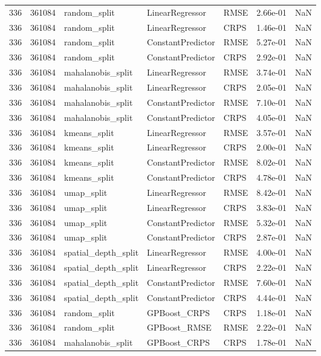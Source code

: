 \begin{tabular}{rrlllrr}
336 & 361084 & random\_split & LinearRegressor & RMSE & 2.66e-01 & NaN \\
336 & 361084 & random\_split & LinearRegressor & CRPS & 1.46e-01 & NaN \\
336 & 361084 & random\_split & ConstantPredictor & RMSE & 5.27e-01 & NaN \\
336 & 361084 & random\_split & ConstantPredictor & CRPS & 2.92e-01 & NaN \\
336 & 361084 & mahalanobis\_split & LinearRegressor & RMSE & 3.74e-01 & NaN \\
336 & 361084 & mahalanobis\_split & LinearRegressor & CRPS & 2.05e-01 & NaN \\
336 & 361084 & mahalanobis\_split & ConstantPredictor & RMSE & 7.10e-01 & NaN \\
336 & 361084 & mahalanobis\_split & ConstantPredictor & CRPS & 4.05e-01 & NaN \\
336 & 361084 & kmeans\_split & LinearRegressor & RMSE & 3.57e-01 & NaN \\
336 & 361084 & kmeans\_split & LinearRegressor & CRPS & 2.00e-01 & NaN \\
336 & 361084 & kmeans\_split & ConstantPredictor & RMSE & 8.02e-01 & NaN \\
336 & 361084 & kmeans\_split & ConstantPredictor & CRPS & 4.78e-01 & NaN \\
336 & 361084 & umap\_split & LinearRegressor & RMSE & 8.42e-01 & NaN \\
336 & 361084 & umap\_split & LinearRegressor & CRPS & 3.83e-01 & NaN \\
336 & 361084 & umap\_split & ConstantPredictor & RMSE & 5.32e-01 & NaN \\
336 & 361084 & umap\_split & ConstantPredictor & CRPS & 2.87e-01 & NaN \\
336 & 361084 & spatial\_depth\_split & LinearRegressor & RMSE & 4.00e-01 & NaN \\
336 & 361084 & spatial\_depth\_split & LinearRegressor & CRPS & 2.22e-01 & NaN \\
336 & 361084 & spatial\_depth\_split & ConstantPredictor & RMSE & 7.60e-01 & NaN \\
336 & 361084 & spatial\_depth\_split & ConstantPredictor & CRPS & 4.44e-01 & NaN \\
336 & 361084 & random\_split & GPBoost\_CRPS & CRPS & 1.18e-01 & NaN \\
336 & 361084 & random\_split & GPBoost\_RMSE & RMSE & 2.22e-01 & NaN \\
336 & 361084 & mahalanobis\_split & GPBoost\_CRPS & CRPS & 1.78e-01 & NaN \\

\end{tabular}
